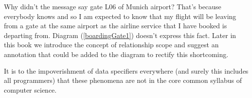 \mynote 
Why didn't the message say gate L06 of Munich airport?
That's because everybody knows and so I am expected to know that my flight will be leaving from a gate at the same airport as the airline service that I have booked is departing from. 
Diagram (\ref{boardingGate1}) doesn't express this fact. 
Later in this book we introduce the concept of relationship scope and 
suggest an annotation that could be added to the diagram to rectify this shortcoming.

It is to the impoverishment of data specifiers everywhere (and surely this includes all programmers) that these phenomena are not in the core common syllabus of computer science. 
